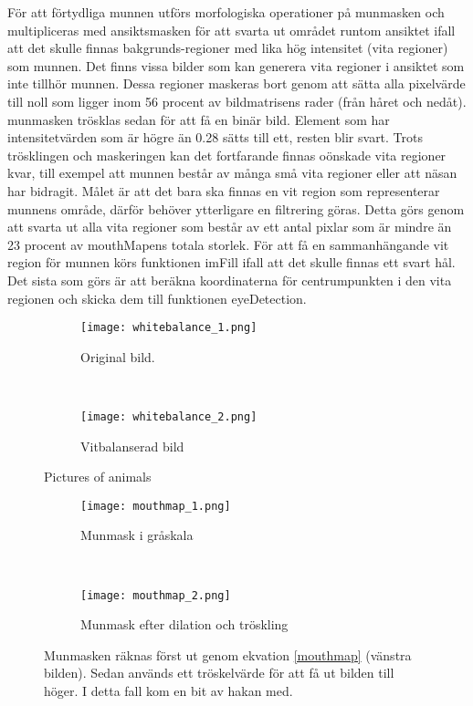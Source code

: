\documentclass[a4paper,12pt,oneside,final]{extbook}
\begin{document}
För att förtydliga munnen utförs morfologiska operationer på munmasken och multipliceras med ansiktsmasken för att svarta ut området runtom ansiktet ifall att det skulle finnas bakgrunds-regioner med lika hög intensitet (vita regioner) som munnen. Det finns vissa bilder som kan generera vita regioner i ansiktet som inte tillhör munnen. Dessa regioner maskeras bort genom att sätta alla pixelvärde till noll som ligger inom 56 procent av bildmatrisens rader (från håret och nedåt). munmasken trösklas sedan för att få en binär bild. Element som har intensitetvärden som är högre än 0.28 sätts till ett, resten blir svart. Trots trösklingen och maskeringen kan det fortfarande finnas oönskade vita regioner kvar, till exempel att munnen består av många små vita regioner eller att näsan har bidragit. Målet är att det bara ska finnas en vit region som representerar munnens område, därför behöver ytterligare en filtrering göras. Detta görs genom att svarta ut alla vita regioner som består av ett antal pixlar som är mindre än 23 procent av mouthMapens totala storlek. För att få en sammanhängande vit region för munnen körs funktionen imFill ifall att det skulle finnas ett svart hål. Det sista som görs är att beräkna koordinaterna för centrumpunkten i den vita regionen och skicka dem till funktionen eyeDetection.


\begin{figure}[h]
    \centering
    \begin{subfigure}[b]{0.4\textwidth}
        \texttt{[image: whitebalance\_1.png]}
        \caption{Original bild.}
        \label{fig:whitebalance_1}
    \end{subfigure}
    ~ %
    \begin{subfigure}[b]{0.4\textwidth}
        \texttt{[image: whitebalance\_2.png]}
        \caption{Vitbalanserad bild}
        \label{fig:whitebalance_2}
    \end{subfigure}

    \caption{Pictures of animals}\label{fig:whitebalance}
\end{figure}


\begin{figure}[h]
    \centering
    \begin{subfigure}[b]{0.4\textwidth}
        \texttt{[image: mouthmap\_1.png]}
        \caption{Munmask i gråskala}
        \label{fig:mouthmap_1}
    \end{subfigure}
    ~ %
    \begin{subfigure}[b]{0.4\textwidth}
        \texttt{[image: mouthmap\_2.png]}
        \caption{Munmask efter dilation och tröskling}
        \label{fig:mouthmap_2}
    \end{subfigure}
    \caption{Munmasken räknas först ut genom ekvation \ref{mouthmap} (vänstra bilden). Sedan används ett tröskelvärde för att få ut bilden till höger. I detta fall kom en bit av hakan med.}\label{fig:mouthmap}
\end{figure}
\end{document}

